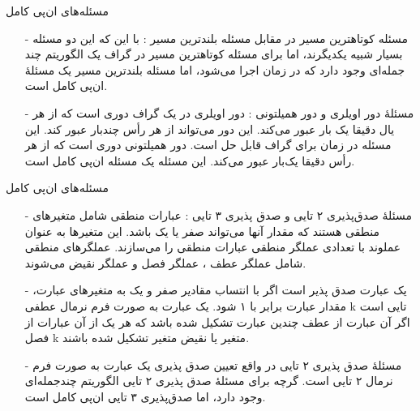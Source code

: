 \begin{frame}{مسئله‌های ان‌پی کامل}
\begin{itemize}\itemr
\item[-]
مسئله کوتاهترین مسیر در مقابل مسئله بلندترین مسیر : با این که این دو مسئله بسیار شبیه یکدیگرند، اما برای مسئله کوتاهترین مسیر در گراف یک الگوریتم چند جمله‌ای وجود دارد که در زمان
اجرا می‌شود، اما مسئله بلندترین مسیر یک مسئلهٔ ان‌پی کامل است.
\item[-]
مسئلهٔ دور اویلری و دور همیلتونی : دور اویلری
در یک گراف دوری است که از هر یال دقیقا یک بار عبور می‌کند. این دور می‌تواند از هر رأس چندبار عبور کند. این مسئله در زمان
برای گراف
قابل حل است.  دور همیلتونی
 دوری است که از هر رأس دقیقا یک‌بار عبور می‌کند. این مسئله یک مسئله ان‌پی کامل است.
\end{itemize}
\end{frame}


\begin{frame}{مسئله‌های ان‌پی کامل}
\begin{itemize}\itemr
\item[-]
مسئلهٔ صدق‌پذیری ۲ تایی و صدق پذیری ۳ تایی : عبارات منطقی شامل متغیرهای منطقی هستند که مقدار آنها می‌تواند صفر یا یک باشد. این متغیرها به عنوان عملوند با تعدادی عملگر منطقی عبارات منطقی را می‌سازند. عملگرهای منطقی شامل عملگر عطف
\m{(\wedge)}
، عملگر فصل
\m{(\vee)}
و عملگر نقیض
\m{(\sim)}
می‌شوند.
\item[-]
یک عبارت صدق پذیر
است اگر با انتساب مقادیر صفر و یک به متغیرهای عبارت، مقدار عبارت برابر با ۱ شود. یک عبارت به صورت فرم نرمال عطفی k تایی است اگر آن عبارت از عطف چندین عبارت تشکیل شده باشد که هر یک از آن عبارات از فصل k متغیر یا نقیض متغیر تشکیل شده باشند.
\item[-]
مسئلهٔ صدق پذیری ۲ تایی در واقع تعیین صدق پذیری یک عبارت به صورت فرم نرمال ۲ تایی است. گرچه برای مسئلهٔ صدق پذیری ۲ تایی الگوریتم چندجمله‌ای وجود دارد، اما صدق‌پذیری ۳ تایی ان‌پی کامل است.
\end{itemize}
\end{frame}


